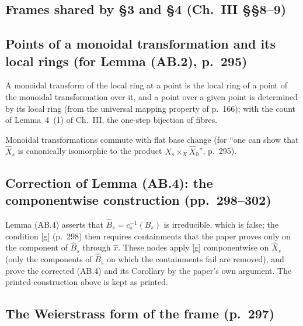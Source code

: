 \subsection*{Frames shared by \S3 and \S4 (Ch.~III \S\S8--9)}


\subsection*{Points of a monoidal transformation and its local rings (for Lemma (AB.2), p.~295)}
A monoidal transform of the local ring at a point is the local ring of a point of the monoidal transformation over it, and
a point over a given point is determined by its local ring (from the universal mapping property of p.~166); with the count
of Lemma~4~(1) of Ch.~III, the one-step bijection of fibres.


Monoidal transformations commute with flat base change (for ``one can show that $\hat X_s$ is canonically isomorphic to
the product $X_s\times_X\hat X_0$'', p.~295).


\subsection*{Correction of Lemma (AB.4): the componentwise construction (pp.~298--302)}

Lemma (AB.4) asserts that $\hat B_s=c_s^{-1}(B_s)$ is irreducible, which is false; the condition [g] (p.~298)
then requires containments that the paper proves only on the component of $\hat B_s$ through $\hat x$. These nodes
apply [g] componentwise on $\hat X_s$ (only the components of $\hat B_s$ on which the containments fail are
removed), and prove the corrected (AB.4) and its Corollary by the paper's own argument. The printed construction
above is kept as printed.


\subsection*{The Weierstrass form of the frame (p.~297)}

